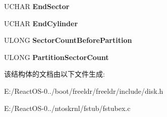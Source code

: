 \begin{DoxyCompactItemize}
U\+C\+H\+AR {\bfseries End\+Sector}
\item 
\mbox{\label{struct___p_a_r_t_i_t_i_o_n___t_a_b_l_e___e_n_t_r_y_ad5f3f45aeeec9b4f08240d203e0c550b}} 
U\+C\+H\+AR {\bfseries End\+Cylinder}
\item 
\mbox{\label{struct___p_a_r_t_i_t_i_o_n___t_a_b_l_e___e_n_t_r_y_a0179a35386c4c3f923b4d02e1812097d}} 
U\+L\+O\+NG {\bfseries Sector\+Count\+Before\+Partition}
\item 
\mbox{\label{struct___p_a_r_t_i_t_i_o_n___t_a_b_l_e___e_n_t_r_y_a019297bb2c0052e138cb76521dd8b5ee}} 
U\+L\+O\+NG {\bfseries Partition\+Sector\+Count}
\end{DoxyCompactItemize}


该结构体的文档由以下文件生成\+:\begin{DoxyCompactItemize}
\item 
E\+:/\+React\+O\+S-\/0../boot/freeldr/freeldr/include/disk.\+h\item 
E\+:/\+React\+O\+S-\/0../ntoskrnl/fstub/fstubex.\+c\end{DoxyCompactItemize}
